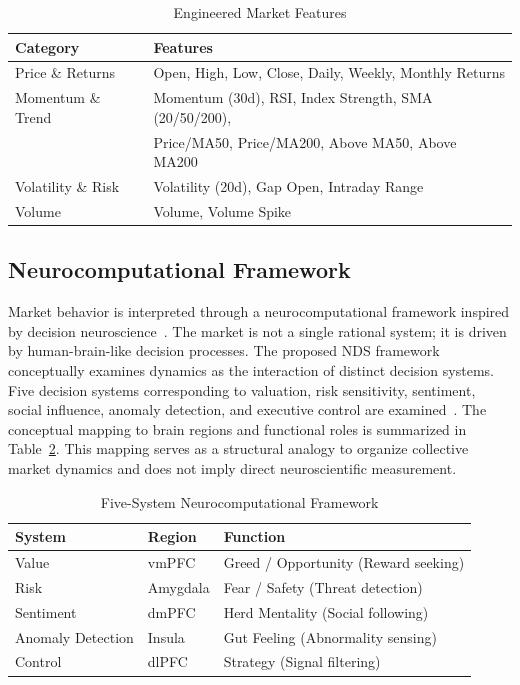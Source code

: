 \documentclass[runningheads,10pt]{llncs}
\begin{document}
\small
\begin{table}[ht]
\caption{Engineered Market Features}\label{tab:features}
\centering
\begin{tabular}{ll}
\toprule
\textbf{Category} & \textbf{Features} \\
\midrule
Price \& Returns & Open, High, Low, Close, Daily, Weekly, Monthly Returns \\
Momentum \& Trend & Momentum (30d), RSI, Index Strength, SMA (20/50/200), \\
                  & Price/MA50, Price/MA200, Above MA50, Above MA200 \\
Volatility \& Risk & Volatility (20d), Gap Open, Intraday Range \\
Volume            & Volume, Volume Spike \\
\bottomrule
\end{tabular}
\end{table}
\vspace{-10pt}
\subsection{Neurocomputational Framework}

Market behavior is interpreted through a neurocomputational framework inspired by decision neuroscience~\cite{glimcher2014,bach2012}. The market is not a single rational system; it is driven by human-brain-like decision processes. The proposed NDS framework conceptually examines dynamics as the interaction of distinct decision systems. Five decision systems corresponding to valuation, risk sensitivity, sentiment, social influence, anomaly detection, and executive control are examined~\cite{boorman2009,demartino2010}. The conceptual mapping to brain regions and functional roles is summarized in Table~\ref{tab:framework}. This mapping serves as a structural analogy to organize collective market dynamics and does not imply direct neuroscientific measurement.
\small
\begin{table}[ht]
\caption{Five-System Neurocomputational Framework}\label{tab:framework}
\centering
\begin{tabular}{lll}
\toprule
\textbf{System} & \textbf{Region} & \textbf{Function} \\
\midrule
Value            & vmPFC    & Greed / Opportunity (Reward seeking) \\
Risk             & Amygdala & Fear / Safety (Threat detection) \\
Sentiment        & dmPFC    & Herd Mentality (Social following) \\
Anomaly Detection & Insula  & Gut Feeling (Abnormality sensing) \\
Control          & dlPFC    & Strategy (Signal filtering) \\
\bottomrule
\end{tabular}
\end{table}
\vspace{-15pt}
\end{document}
